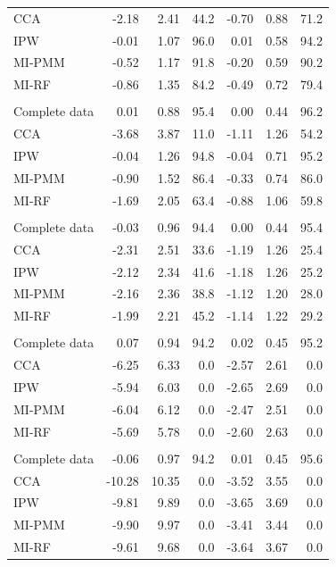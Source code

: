 \begin{longtable}{l|rrrrrr}
CCA & -2.18 & 2.41 & 44.2 & -0.70 & 0.88 & 71.2 \\ 
IPW & -0.01 & 1.07 & 96.0 & 0.01 & 0.58 & 94.2 \\ 
MI-PMM & -0.52 & 1.17 & 91.8 & -0.20 & 0.59 & 90.2 \\ 
MI-RF & -0.86 & 1.35 & 84.2 & -0.49 & 0.72 & 79.4 \\ 
\midrule\addlinespace[2.5pt]
\multicolumn{7}{l}{MAR-strong, 50\% missing} \\[2.5pt] 
\midrule\addlinespace[2.5pt]
Complete data & 0.01 & 0.88 & 95.4 & 0.00 & 0.44 & 96.2 \\ 
CCA & -3.68 & 3.87 & 11.0 & -1.11 & 1.26 & 54.2 \\ 
IPW & -0.04 & 1.26 & 94.8 & -0.04 & 0.71 & 95.2 \\ 
MI-PMM & -0.90 & 1.52 & 86.4 & -0.33 & 0.74 & 86.0 \\ 
MI-RF & -1.69 & 2.05 & 63.4 & -0.88 & 1.06 & 59.8 \\ 
\midrule\addlinespace[2.5pt]
\multicolumn{7}{l}{MNAR, 10\% missing} \\[2.5pt] 
\midrule\addlinespace[2.5pt]
Complete data & -0.03 & 0.96 & 94.4 & 0.00 & 0.44 & 95.4 \\ 
CCA & -2.31 & 2.51 & 33.6 & -1.19 & 1.26 & 25.4 \\ 
IPW & -2.12 & 2.34 & 41.6 & -1.18 & 1.26 & 25.2 \\ 
MI-PMM & -2.16 & 2.36 & 38.8 & -1.12 & 1.20 & 28.0 \\ 
MI-RF & -1.99 & 2.21 & 45.2 & -1.14 & 1.22 & 29.2 \\ 
\midrule\addlinespace[2.5pt]
\multicolumn{7}{l}{MNAR, 30\% missing} \\[2.5pt] 
\midrule\addlinespace[2.5pt]
Complete data & 0.07 & 0.94 & 94.2 & 0.02 & 0.45 & 95.2 \\ 
CCA & -6.25 & 6.33 & 0.0 & -2.57 & 2.61 & 0.0 \\ 
IPW & -5.94 & 6.03 & 0.0 & -2.65 & 2.69 & 0.0 \\ 
MI-PMM & -6.04 & 6.12 & 0.0 & -2.47 & 2.51 & 0.0 \\ 
MI-RF & -5.69 & 5.78 & 0.0 & -2.60 & 2.63 & 0.0 \\ 
\midrule\addlinespace[2.5pt]
\multicolumn{7}{l}{MNAR, 50\% missing} \\[2.5pt] 
\midrule\addlinespace[2.5pt]
Complete data & -0.06 & 0.97 & 94.2 & 0.01 & 0.45 & 95.6 \\ 
CCA & -10.28 & 10.35 & 0.0 & -3.52 & 3.55 & 0.0 \\ 
IPW & -9.81 & 9.89 & 0.0 & -3.65 & 3.69 & 0.0 \\ 
MI-PMM & -9.90 & 9.97 & 0.0 & -3.41 & 3.44 & 0.0 \\ 
MI-RF & -9.61 & 9.68 & 0.0 & -3.64 & 3.67 & 0.0 \\ 
\bottomrule
\end{longtable}
